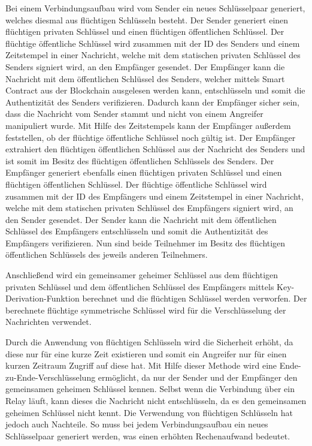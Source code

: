 Bei einem Verbindungsaufbau wird vom Sender ein neues Schlüsselpaar generiert, welches diesmal aus flüchtigen Schlüsseln besteht. Der Sender generiert einen flüchtigen privaten Schlüssel und einen flüchtigen öffentlichen Schlüssel. Der flüchtige öffentliche Schlüssel wird zusammen mit der ID des Senders und einem Zeitstempel in einer Nachricht, welche mit dem statischen privaten Schlüssel des Senders signiert wird, an den Empfänger gesendet. Der Empfänger kann die Nachricht mit dem öffentlichen Schlüssel des Senders, welcher mittels Smart Contract aus der Blockchain ausgelesen werden kann, entschlüsseln und somit die Authentizität des Senders verifizieren. Dadurch kann der Empfänger sicher sein, dass die Nachricht vom Sender stammt und nicht von einem Angreifer manipuliert wurde. Mit Hilfe des Zeitstempels kann der Empfänger außerdem feststellen, ob der flüchtige öffentliche Schlüssel noch gültig ist. Der Empfänger extrahiert den flüchtigen öffentlichen Schlüssel aus der Nachricht des Senders und ist somit im Besitz des flüchtigen öffentlichen Schlüssels des Senders. Der Empfänger generiert ebenfalls einen flüchtigen privaten Schlüssel und einen flüchtigen öffentlichen Schlüssel. Der flüchtige öffentliche Schlüssel wird zusammen mit der ID des Empfängers und einem Zeitstempel in einer Nachricht, welche mit dem statischen privaten Schlüssel des Empfängers signiert wird, an den Sender gesendet. Der Sender kann die Nachricht mit dem öffentlichen Schlüssel des Empfängers entschlüsseln und somit die Authentizität des Empfängers verifizieren. Nun sind beide Teilnehmer im Besitz des flüchtigen öffentlichen Schlüssels des jeweils anderen Teilnehmers.


Anschließend wird ein gemeinsamer geheimer Schlüssel aus dem flüchtigen privaten Schlüssel und dem öffentlichen Schlüssel des Empfängers mittels Key-Derivation-Funktion berechnet und die flüchtigen Schlüssel werden verworfen. Der berechnete flüchtige symmetrische Schlüssel wird für die Verschlüsselung der Nachrichten verwendet.

Durch die Anwendung von flüchtigen Schlüsseln wird die Sicherheit erhöht, da diese nur für eine kurze Zeit existieren und somit ein Angreifer nur für einen kurzen Zeitraum Zugriff auf diese hat. Mit Hilfe dieser Methode wird eine Ende-zu-Ende-Verschlüsselung ermöglicht, da nur der Sender und der Empfänger den gemeinsamen geheimen Schlüssel kennen. Selbst wenn die Verbindung über ein Relay läuft, kann dieses die Nachricht nicht entschlüsseln, da es den gemeinsamen geheimen Schlüssel nicht kennt. Die Verwendung von flüchtigen Schlüsseln hat jedoch auch Nachteile. So muss bei jedem Verbindungsaufbau ein neues Schlüsselpaar generiert werden, was einen erhöhten Rechenaufwand bedeutet. 

